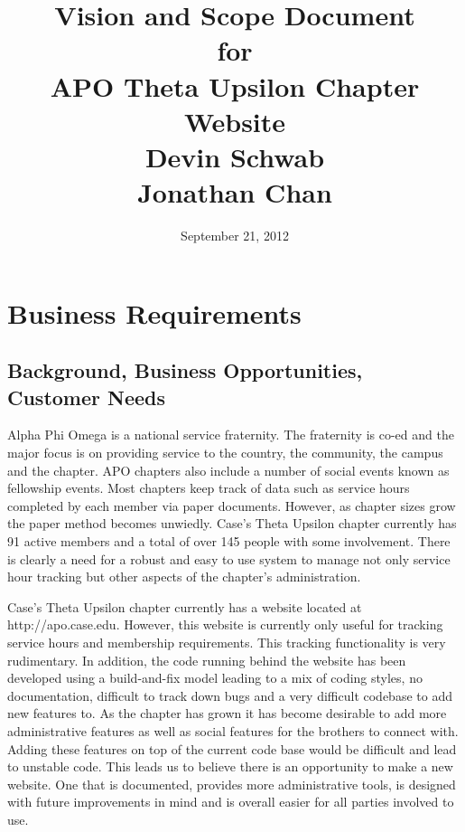 \documentclass[11pt,letterpaper,rotate]{article}
\title{Vision and Scope Document \\
for \\
APO Theta Upsilon Chapter Website\\
Devin Schwab\\
Jonathan Chan}
\date{September 21, 2012}
\begin{document}
\maketitle
\newpage

\tableofcontents


\newpage

\section{Business Requirements}

\subsection{Background, Business Opportunities, Customer Needs}

\indent\indent Alpha Phi Omega is a national service fraternity. The
fraternity is co-ed and the major focus is on providing service to the
country, the community, the campus and the chapter. APO chapters also
include a number of social events known as fellowship events. Most chapters keep track of data such as service hours completed by each member via paper documents. However, as chapter sizes grow the paper method becomes unwiedly. Case's Theta Upsilon chapter currently has 91 active members and a total of over 145 people with some involvement. There is clearly a need for a robust and easy to use system to manage not only service hour tracking but other aspects of the chapter's administration.

Case's Theta Upsilon chapter currently has a website located at \\
http://apo.case.edu. However, this website is currently only useful for
tracking service hours and membership requirements. This tracking functionality is very rudimentary. In addition, the code running behind the website has been developed using a build-and-fix model leading to a mix of coding styles, no documentation, difficult to track down bugs and a very difficult codebase to add new features to. As the chapter has grown it has become desirable to add more administrative features as well as social features for the brothers to connect with. Adding these features on top of the current code base would be difficult and lead to unstable code. This leads us to believe there is an opportunity to make a new website. One that is documented, provides more administrative tools, is designed with future improvements in mind and is overall easier for all parties involved to use.
\end{document}
